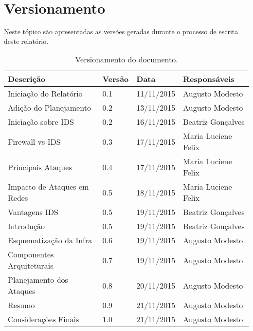 \chapter[Versionamento]{Versionamento}
\label{chap:versionamento}
	Neste tópico são apresentadas as versões geradas durante o processo de escrita deste relatório.
	
	\label{subsubsec:versionamento_talbe}
		\begin{table}[h]
			\centering
			\begin{tabular}{|p{6cm}|p{1.5cm}|p{2.5cm}|p{4cm}|}
				
				\hline
				
				Descrição & Versão & Data & Responsáveis \\ \hline
				Iniciação do Relatório & 0.1 & 11/11/2015 & Augusto Modesto \\ \hline
				Adição do Planejamento & 0.2 & 13/11/2015 & Augusto Modesto \\ \hline
				Iniciação sobre IDS & 0.2 & 16/11/2015 & Beatriz Gonçalves \\ \hline
				Firewall vs IDS & 0.3 & 17/11/2015 & Maria Luciene Felix \\ \hline
				Principais Ataques & 0.4 & 17/11/2015 & Maria Luciene Felix \\ \hline
				Impacto de Ataques em Redes & 0.5 & 18/11/2015 & Maria Luciene Felix \\ \hline
				Vantagens IDS & 0.5 & 19/11/2015 & Beatriz Gonçalves \\ \hline				
				Introdução & 0.5 & 19/11/2015 & Beatriz Gonçalves \\ \hline		
				Esquematização da Infra & 0.6 & 19/11/2015 & Augusto Modesto \\ \hline
				Componentes Arquiteturais & 0.7 & 19/11/2015 & Augusto Modesto \\ \hline
				Planejamento dos Ataques & 0.8 & 20/11/2015 & Augusto Modesto \\ \hline
				Resumo & 0.9 & 21/11/2015 & Augusto Modesto \\ \hline
				Considerações Finais & 1.0 & 21/11/2015 & Augusto Modesto \\ \hline

				
			\end{tabular}
			\caption[Versionamento do Documento]{Versionamento do documento.}
			\label{tab:versionamento_tabl}
		\end{table}
